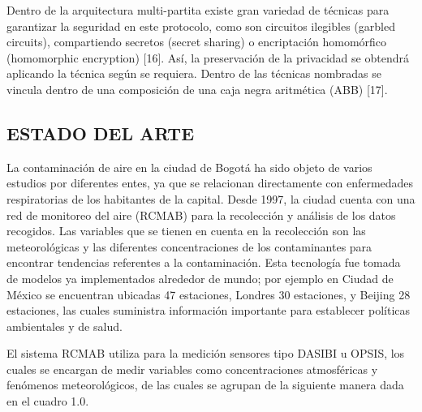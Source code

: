 \documentclass[a4paper, 12pt, oneside]{article}
\theoremstyle{definition}
\theoremstyle{remark}
\begin{document}
Dentro de la arquitectura multi-partita existe gran variedad de técnicas para garantizar la seguridad en este protocolo, como son circuitos ilegibles (garbled circuits), compartiendo secretos (secret sharing) o encriptación homomórfico (homomorphic encryption) [16]. Así, la preservación de la privacidad se obtendrá aplicando la técnica según se requiera. Dentro de las técnicas nombradas se vincula dentro de una composición de una caja negra aritmética (ABB) [17].

\subsection{ESTADO DEL ARTE}
La contaminación de aire en la ciudad de Bogotá ha sido objeto de varios estudios por diferentes entes, ya que se relacionan directamente con enfermedades respiratorias de los habitantes de la capital. Desde 1997, la ciudad cuenta con una red de monitoreo del aire (RCMAB) para la recolección y análisis de los datos recogidos. Las variables que se tienen en cuenta en la recolección son las meteorológicas y las diferentes concentraciones de los contaminantes para encontrar tendencias referentes a la contaminación. Esta tecnología fue tomada de modelos ya implementados alrededor de mundo; por ejemplo en Ciudad de México se encuentran ubicadas 47 estaciones, Londres 30 estaciones, y Beijing 28 estaciones, las cuales suministra información importante para establecer políticas ambientales y de salud.

El sistema RCMAB utiliza para la medición sensores tipo DASIBI u OPSIS, los cuales se encargan de medir variables  como concentraciones atmosféricas y fenómenos meteorológicos, de las cuales se agrupan de la siguiente manera dada en el cuadro 1.0.
\end{document}
